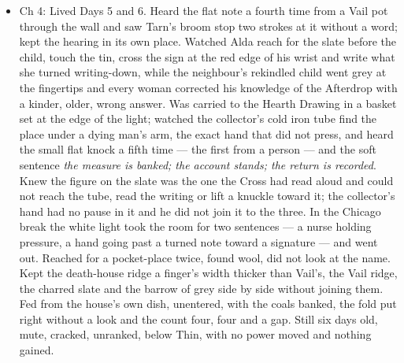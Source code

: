 \documentclass{design/chronicle}
\begin{document}
{\begin{itemize}[leftmargin=1.4em,itemsep=1pt,topsep=3pt,parsep=0pt]
\item Ch 4: Lived Days 5 and 6. Heard the flat note a fourth time from a Vail pot through the wall and saw Tarn’s broom stop two strokes at it without a word; kept the hearing in its own place. Watched Alda reach for the slate before the child, touch the tin, cross the sign at the red edge of his wrist and write what she turned writing-down, while the neighbour’s rekindled child went grey at the fingertips and every woman corrected his knowledge of the Afterdrop with a kinder, older, wrong answer. Was carried to the Hearth Drawing in a basket set at the edge of the light; watched the collector’s cold iron tube find the place under a dying man’s arm, the exact hand that did not press, and heard the small flat knock a fifth time --- the first from a person --- and the soft sentence \emph{the measure is banked; the account stands; the return is recorded}. Knew the figure on the slate was the one the Cross had read aloud and could not reach the tube, read the writing or lift a knuckle toward it; the collector’s hand had no pause in it and he did not join it to the three. In the Chicago break the white light took the room for two sentences --- a nurse holding pressure, a hand going past a turned note toward a signature --- and went out. Reached for a pocket-place twice, found wool, did not look at the name. Kept the death-house ridge a finger’s width thicker than Vail’s, the Vail ridge, the charred slate and the barrow of grey side by side without joining them. Fed from the house’s own dish, unentered, with the coals banked, the fold put right without a look and the count four, four and a gap. Still six days old, mute, cracked, unranked, below Thin, with no power moved and nothing gained.

\end{itemize}

\begin{itemize}[leftmargin=1.4em,itemsep=1pt,topsep=3pt,parsep=0pt]


\end{itemize}}
\end{document}
